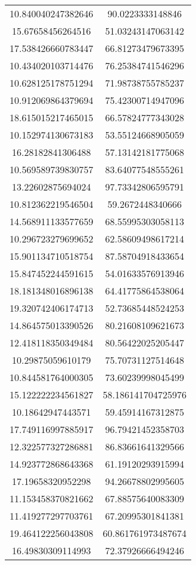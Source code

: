 \begin{table}
\begin{tabular}{cc}
10.840040247382646 & 90.0223333148846 \\
15.67658456264516 & 51.03243147063142 \\
17.538426660783447 & 66.81273479673395 \\
10.434020103714476 & 76.25384741546296 \\
10.628125178751294 & 71.98738755785237 \\
10.912069864379694 & 75.42300714947096 \\
18.615015217465015 & 66.57824777343028 \\
10.152974130673183 & 53.55124668905059 \\
16.28182841306488 & 57.13142181775068 \\
10.569589739830757 & 83.64077548555261 \\
13.22602875694024 & 97.73342806595791 \\
10.812362219546504 & 59.2672448340666 \\
14.568911133577659 & 68.55995303058113 \\
10.296723279699652 & 62.58609498617214 \\
15.901134710518754 & 87.58704918433654 \\
15.847452244591615 & 54.01633576913946 \\
18.181348016896138 & 64.41775864538064 \\
19.320742406174713 & 52.73685448524253 \\
14.864575013390526 & 80.21608109621673 \\
12.418118350349484 & 80.56422025205447 \\
10.29875059610179 & 75.70731127514648 \\
10.844581764000305 & 73.60239998045499 \\
15.122222234561827 & 58.186141704725976 \\
10.18642947443571 & 59.45914167312875 \\
17.749116997885917 & 96.79421452358703 \\
12.322577327286881 & 86.83661641329566 \\
14.923772868643368 & 61.19120293915994 \\
17.19658320952298 & 94.26678802995605 \\
11.153458370821662 & 67.88575640083309 \\
11.419277297703761 & 67.20995301841381 \\
19.464122256043808 & 60.861761973487674 \\
16.49830309114993 & 72.37926666494246 \\

\end{tabular}
\end{table}
